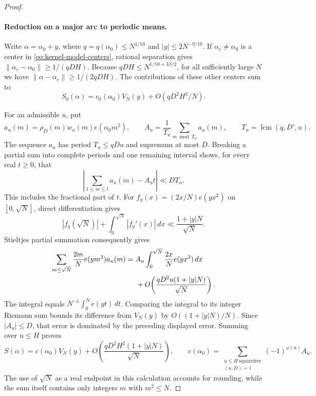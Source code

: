 \begin{proof}
\paragraph{Reduction on a major arc to periodic means.}
Write $\alpha=\alpha_0+y$, where
$q=q(\alpha_0)\le N^{1/10}$ and $|y|\le2N^{-9/10}$.
If $\alpha_c\ne\alpha_0$ is a center in
\eqref{eq:kernel-model-centers}, rational separation gives
$\|\alpha_c-\alpha_0\|\ge1/(qDH)$.
Because $qDH\le N^{1/10+3\beta/2}$, for all sufficiently large $N$
we have $\|\alpha-\alpha_c\|\ge1/(2qDH)$.
The contributions of these other centers sum to
\begin{equation}
 S_0(\alpha)=c_0(\alpha_0)V_N(y)+O(qD^2H^3/N).
 \label{eq:kernel-major-model}
\end{equation}

For an admissible $u$, put
\[
 a_u(m)=\rho_D(m)w_u(m)e(\alpha_0m^2),
 \qquad
 A_u=\frac1{T_u}\sum_{m\bmod T_u}a_u(m),
 \qquad T_u=\operatorname{lcm}(q,D',u).
\]
The sequence $a_u$ has period $T_u\le qDu$ and supremum at most $D$.
Breaking a partial sum into complete periods and one remaining interval
shows, for every real $t\ge0$, that
\[
 \left|\sum_{1\le m\le t}a_u(m)-A_ut\right|\ll DT_u.
\]
This includes the fractional part of $t$.
For $f_y(x)=(2x/N)e(yx^2)$ on $[0,\sqrt N]$, direct differentiation gives
\[
 |f_y(\sqrt N)|+\int_0^{\sqrt N}|f_y'(x)|\,dx
 \ll\frac{1+|y|N}{\sqrt N}.
\]
Stieltjes partial summation consequently gives
\begin{align*}
 \sum_{m\le\sqrt N}\frac{2m}{N}e(ym^2)a_u(m)
 &=A_u\int_0^{\sqrt N}\frac{2x}{N}e(yx^2)\,dx\\
 &\hspace{5mm}+O\!\left(\frac{qD^2u(1+|y|N)}{\sqrt N}\right).
\end{align*}
The integral equals $N^{-1}\int_0^N e(yt)\,dt$.
Comparing the integral to its integer Riemann sum bounds its difference
from $V_N(y)$ by $O((1+|y|N)/N)$. Since $|A_u|\le D$, that error
is dominated by the preceding displayed error.
Summing over $u\le H$ proves
\begin{equation}
 S(\alpha)=c(\alpha_0)V_N(y)
       +O\!\left(\frac{qD^2H^2(1+|y|N)}{\sqrt N}\right),
 \qquad
 c(\alpha_0)=\sum_{\substack{u\le H\ \mathrm{squarefree}\\(u,D)=1}}
                  (-1)^{\omega(u)}A_u.
 \label{eq:kernel-major-actual}
\end{equation}
The use of $\sqrt N$ as a real endpoint in this calculation accounts
for rounding, while the sum itself contains only integers $m$ with
$m^2\le N$.


\end{proof}
